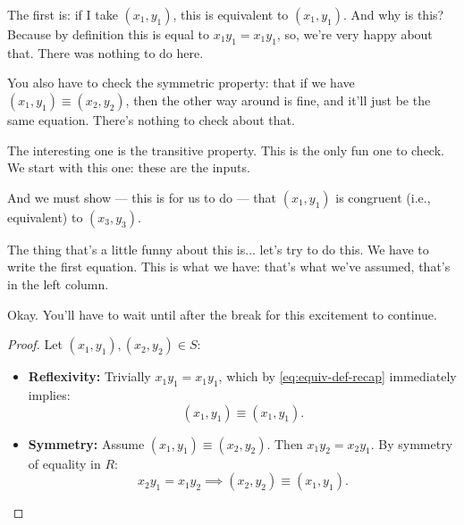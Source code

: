 \begin{speech}[00:44:08 - 00:45:05]
The first is: if I take $(x_1, y_1)$, this is equivalent to $(x_1, y_1)$.  And why is this? Because by definition this is equal to $x_1 y_1 = x_1 y_1$,  so, we're very happy about that. There was nothing to do here.

You also have to check the symmetric property: that if we have $(x_1, y_1) \equiv (x_2, y_2)$, then the other way around is fine, and it'll just be the same equation. There's nothing to check about that. 

The interesting one is the transitive property.  This is the only fun one to check. We start with this one:  these are the inputs.

And we must show --- this is for us to do --- that $(x_1, y_1)$ is congruent (i.e., equivalent) to $(x_3, y_3)$. 

The thing that's a little funny about this is... let's try to do this. We have to write the first equation. This is what we have:  that's what we've assumed, that's in the left column.

Okay. You'll have to wait until after the break for this excitement to continue.
\end{speech}

\begin{content}

\begin{proof}
Let $(x_1, y_1), (x_2, y_2) \in S$:
\begin{itemize}
    \item \textbf{Reflexivity:} Trivially $x_1 y_1 = x_1 y_1$, which by \eqref{eq:equiv-def-recap} immediately implies:
    \[
    (x_1, y_1) \equiv (x_1, y_1).
    \]
    \item \textbf{Symmetry:} Assume $(x_1, y_1) \equiv (x_2, y_2)$. Then $x_1 y_2 = x_2 y_1$. By symmetry of equality in $R$:
    \[
    x_2 y_1 = x_1 y_2 \implies (x_2, y_2) \equiv (x_1, y_1).
    \]
\end{itemize}
\end{proof}
\end{content}

